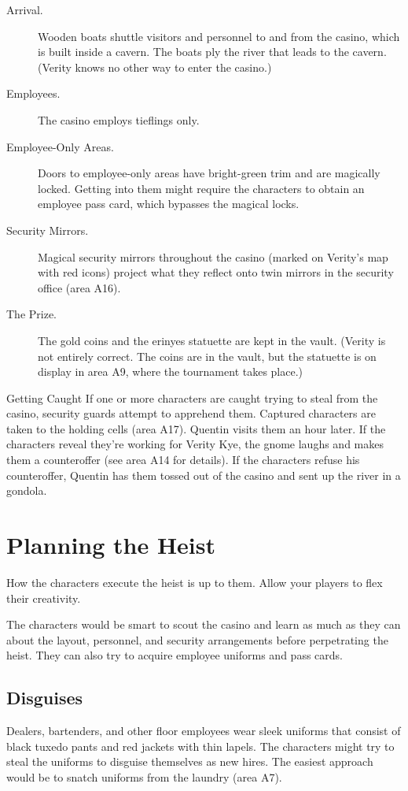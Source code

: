 \documentclass[10pt,a4paper,twoside,bg=print,twocolumn,openany,nodeprecatedcode]{dndbook}
\begin{document}
\begin{description}
\item[Arrival.]
Wooden boats shuttle visitors and personnel to and from the casino, which is built inside a cavern. The boats ply the river that leads to the cavern. (Verity knows no other way to enter the casino.)
\item[Employees.]
The casino employs tieflings only.
\item[Employee-Only Areas.]
Doors to employee-only areas have bright-green trim and are magically locked. Getting into them might require the characters to obtain an employee pass card, which bypasses the magical locks.
\item[Security Mirrors.]
Magical security mirrors throughout the casino (marked on Verity's map with red icons) project what they reflect onto twin mirrors in the security office (area A16).
\item[The Prize.]
The gold coins and the erinyes statuette are kept in the vault. (Verity is not entirely correct. The coins are in the vault, but the statuette is on display in area A9, where the tournament takes place.)
\end{description}

\begin{DndSidebar}[float=!b]{Getting Caught}
If one or more characters are caught trying to steal from the casino, security guards attempt to apprehend them. Captured characters are taken to the holding cells (area A17). Quentin visits them an hour later. If the characters reveal they're working for Verity Kye, the gnome laughs and makes them a counteroffer (see area A14 for details). If the characters refuse his counteroffer, Quentin has them tossed out of the casino and sent up the river in a gondola.



\end{DndSidebar}

\section{Planning the Heist}
How the characters execute the heist is up to them. Allow your players to flex their creativity.

The characters would be smart to scout the casino and learn as much as they can about the layout, personnel, and security arrangements before perpetrating the heist. They can also try to acquire employee uniforms and pass cards.

\subsection{Disguises}
Dealers, bartenders, and other floor employees wear sleek uniforms that consist of black tuxedo pants and red jackets with thin lapels. The characters might try to steal the uniforms to disguise themselves as new hires. The easiest approach would be to snatch uniforms from the laundry (area A7).
\end{document}
